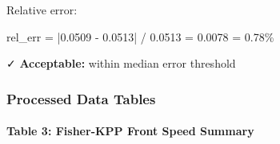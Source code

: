 \documentclass[
]{article}
\newenvironment{Shaded}{}{}
\newcommand{\FloatTok}[1]{\textcolor[rgb]{0.25,0.63,0.44}{#1}}
\newcommand{\NormalTok}[1]{#1}
\newcommand{\OperatorTok}[1]{\textcolor[rgb]{0.40,0.40,0.40}{#1}}
\begin{document}
Relative error:

\begin{Shaded}
\begin{Highlighting}[]
\NormalTok{rel\_err }\OperatorTok{=} \OperatorTok{|}\FloatTok{0.0509} \OperatorTok{{-}} \FloatTok{0.0513}\OperatorTok{|} \OperatorTok{/} \FloatTok{0.0513} \OperatorTok{=} \FloatTok{0.0078} \OperatorTok{=} \FloatTok{0.78}\OperatorTok{\%}
\end{Highlighting}
\end{Shaded}

✓ \textbf{Acceptable:} within median error threshold

\hypertarget{processed-data-tables}{%
\subsubsection{Processed Data Tables}\label{processed-data-tables}}

\hypertarget{table-3-fisher-kpp-front-speed-summary}{%
\paragraph{\texorpdfstring{\textbf{Table 3: Fisher-KPP Front Speed
Summary}}{Table 3: Fisher-KPP Front Speed Summary}}\label{table-3-fisher-kpp-front-speed-summary}}
\end{document}
